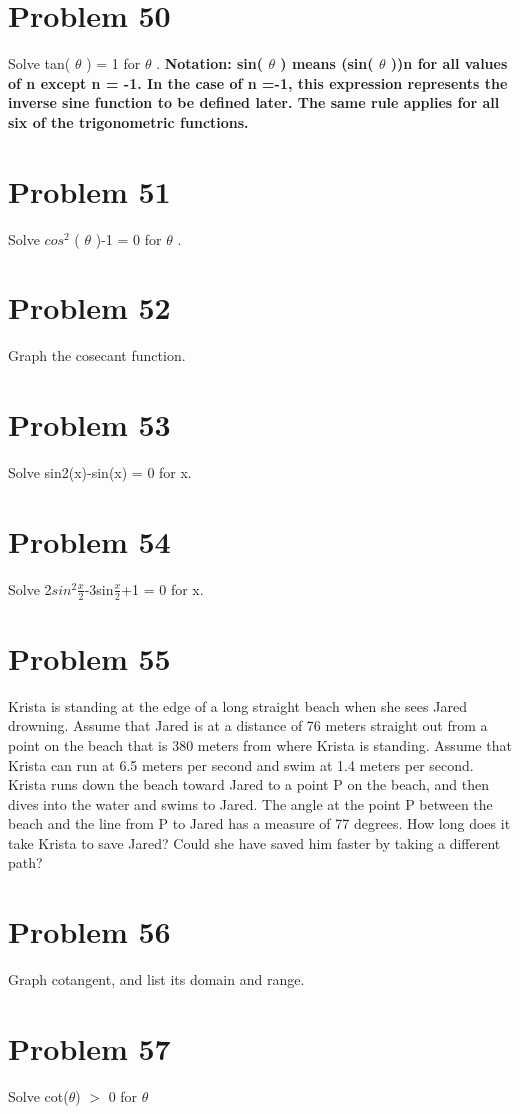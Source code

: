 \documentclass[11pt]{article} %
\begin{document}
\newpage \section*{Problem 50} Solve tan( $\theta$ ) = 1 for $\theta$ . 
\textbf{Notation: sin( $\theta$ ) means (sin( $\theta$ ))n for all values of n except n = 
-1. In the case of n =-1, this expression represents the inverse sine function to be defined later. The same rule applies for all six of the trigonometric functions.}
\newpage \section*{Problem 51} Solve $cos^{2}$ ( $\theta$ )-1 = 0 for $\theta$ .
\newpage \section*{Problem 52} Graph the cosecant function. 
\newpage \section*{Problem 53 } Solve sin2(x)-sin(x) = 0 for x. 
\newpage \section*{Problem 54} Solve 2$sin^{2}\frac{x}{2}$-3sin$\frac{x}{2}$+1 = 0 for x. 
\newpage \section*{Problem 55} Krista is standing at the edge of a long straight beach when she sees Jared drowning. Assume that Jared is at a distance of 76 meters straight out from a point on the beach that is 380 meters from where Krista is standing. Assume that Krista can run at 6.5 meters per second and swim at 1.4 meters per second. Krista runs down the beach toward Jared to a point P on the beach, and then dives into the water and swims to Jared. The angle at the point P between the beach and the line from P to Jared has a measure of 77 degrees. How long does it take Krista to save Jared? Could she have saved him faster by taking a different path?
\newpage \section*{Problem 56}  Graph cotangent, and list its domain and range.
\newpage \section*{Problem 57} Solve cot($\theta$) $>$ 0 for $\theta$
\end{document}
